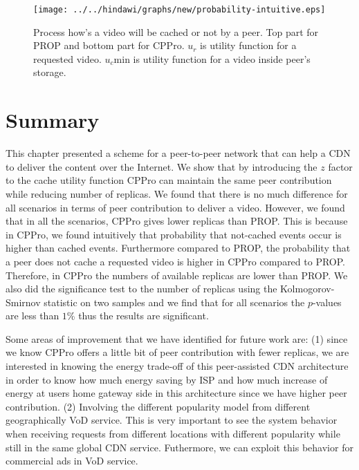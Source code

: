 \begin{figure}[!t]
\begin{center}
\texttt{[image: ../../hindawi/graphs/new/probability-intuitive.eps]}
\end{center}
\caption{Process how's a video will be cached or not by a peer. Top part for PROP and bottom part for CPPro. 
$u_r$ is utility function for a requested video.  
$u_c$min is utility function for a video inside peer's storage.
}
\label{fig:cached-notcached}
\end{figure} 




\section{Summary}
This chapter presented a scheme for a peer-to-peer network that can help a CDN to deliver the content over the Internet. 
We show that by introducing the $z$ factor to the cache utility function CPPro can maintain the same peer contribution while reducing number of replicas.
We found that there is no much difference for all scenarios in terms of peer contribution to deliver a video. 
However, we found that in all the scenarios, CPPro gives lower replicas than PROP. 
This is because in CPPro, we found intuitively that probability that not-cached events occur is higher than cached events. 
Furthermore compared to PROP, the probability that a peer does not cache a requested video is higher in CPPro compared to PROP.
Therefore, in CPPro the numbers of available replicas are lower than PROP. 
We also did the significance test to the number of replicas using the Kolmogorov-Smirnov statistic on two samples and we find that for all scenarios the $p$-values are less than $1$\% thus the results are significant. 

Some areas of improvement that we have identified for future work are: 
(1) since we know CPPro offers a little bit of peer contribution with fewer replicas, we are interested in knowing the energy trade-off of this peer-assisted CDN architecture in order to know how much energy saving by ISP and how much increase of energy at users home gateway side in this architecture since we have higher peer contribution.   
(2) Involving the different popularity model from different geographically VoD service.
This is very important to see the system behavior when receiving requests from different locations with different popularity while still in the same global CDN service. 
Futhermore, we can exploit this behavior for commercial ads in VoD service.